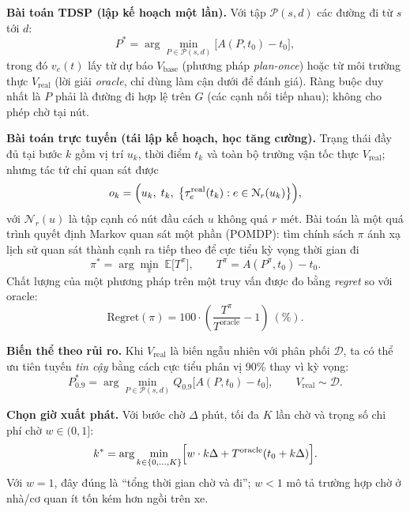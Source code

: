\textbf{Bài toán TDSP (lập kế hoạch một lần).} Với tập $\mathcal{P}(s,d)$ các đường đi từ $s$ tới $d$:
\begin{equation}
P^\ast = \arg\min_{P\in\mathcal{P}(s,d)} \bigl[A(P,t_0)-t_0\bigr],
\label{eq:tdsp}
\end{equation}
trong đó $v_e(t)$ lấy từ dự báo $V_{\text{base}}$ (phương pháp \emph{plan-once}) hoặc từ môi trường thực $V_{\text{real}}$
(lời giải \emph{oracle}, chỉ dùng làm cận dưới để đánh giá). Ràng buộc duy nhất là $P$ phải là đường đi hợp lệ trên $G$
(các cạnh nối tiếp nhau); không cho phép chờ tại nút.

\textbf{Bài toán trực tuyến (tái lập kế hoạch, học tăng cường).} Trạng thái đầy đủ tại bước $k$ gồm vị trí $u_k$, thời
điểm $t_k$ và toàn bộ trường vận tốc thực $V_{\text{real}}$; nhưng tác tử chỉ quan sát được
\begin{equation}
o_k = \Bigl(u_k,\; t_k,\; \bigl\{\tau^{\text{real}}_e(t_k) : e\in\mathcal{N}_r(u_k)\bigr\}\Bigr),
\label{eq:observation}
\end{equation}
với $\mathcal{N}_r(u)$ là tập cạnh có nút đầu cách $u$ không quá $r$ mét. Bài toán là một quá trình quyết định Markov
quan sát một phần (POMDP): tìm chính sách $\pi$ ánh xạ lịch sử quan sát thành cạnh ra tiếp theo để cực tiểu kỳ vọng thời
gian đi
\begin{equation}
\pi^\ast = \arg\min_\pi \; \mathbb{E}\bigl[T^\pi\bigr], \qquad T^\pi = A(P^\pi,t_0)-t_0 .
\label{eq:pomdp}
\end{equation}
Chất lượng của một phương pháp trên một truy vấn được đo bằng \emph{regret} so với oracle:
\begin{equation}
\text{Regret}(\pi) = 100\cdot\left(\frac{T^\pi}{T^{\text{oracle}}}-1\right)\ (\%).
\label{eq:regret}
\end{equation}

\textbf{Biến thể theo rủi ro.} Khi $V_{\text{real}}$ là biến ngẫu nhiên với phân phối $\mathcal{D}$, ta có thể ưu tiên
tuyến \emph{tin cậy} bằng cách cực tiểu phân vị 90\% thay vì kỳ vọng:
\begin{equation}
P^{\ast}_{0.9} = \arg\min_{P\in\mathcal{P}(s,d)} Q_{0.9}\bigl[A(P,t_0)-t_0\bigr], \qquad V_{\text{real}}\sim\mathcal{D}.
\label{eq:risk}
\end{equation}

\textbf{Chọn giờ xuất phát.} Với bước chờ $\Delta$ phút, tối đa $K$ lần chờ và trọng số chi phí chờ $w\in(0,1]$:
\begin{equation}
k^\ast = \arg\min_{k\in\{0,\dots,K\}} \Bigl[w\cdot k\Delta + T^{\text{oracle}}(t_0+k\Delta)\Bigr].
\label{eq:departure}
\end{equation}
Với $w=1$, đây đúng là ``tổng thời gian chờ và đi''; $w<1$ mô tả trường hợp chờ ở nhà/cơ quan ít tốn kém hơn ngồi trên xe.

